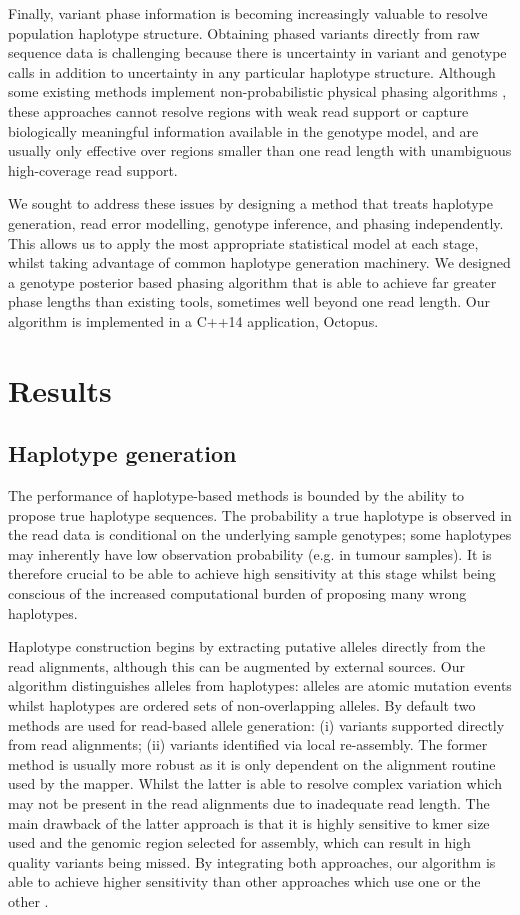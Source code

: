 \documentclass[notitlepage, twocolumn]{article}
\begin{document}
Finally, variant phase information is becoming increasingly valuable to resolve population haplotype structure. Obtaining phased variants directly from raw sequence data is challenging because there is uncertainty in variant and genotype calls in addition to uncertainty in any particular haplotype structure. Although some existing methods implement non-probabilistic physical phasing algorithms \cite{freebayes}, these approaches cannot resolve regions with weak read support or capture biologically meaningful information available in the genotype model, and are usually only effective over regions smaller than one read length with unambiguous high-coverage read support.

We sought to address these issues by designing a method that treats haplotype generation, read error modelling, genotype inference, and phasing independently. This allows us to apply the most appropriate statistical model at each stage, whilst taking advantage of common haplotype generation machinery. We designed a genotype posterior based phasing algorithm that is able to achieve far greater phase lengths than existing tools, sometimes well beyond one read length. Our algorithm is implemented in a C++14 application, Octopus.

\section*{Results}

\subsection*{Haplotype generation}

The performance of haplotype-based methods is bounded by the ability to propose true haplotype sequences. The probability a true haplotype is observed in the read data is conditional on the underlying sample genotypes; some haplotypes may inherently have low observation probability (e.g. in tumour samples). It is therefore crucial to be able to achieve high sensitivity at this stage whilst being conscious of the increased computational burden of proposing many wrong haplotypes.

Haplotype construction begins by extracting putative alleles directly from the read alignments, although this can be augmented by external sources. Our algorithm distinguishes alleles from haplotypes: alleles are atomic mutation events whilst haplotypes are ordered sets of non-overlapping alleles. By default two methods are used for read-based allele generation: (i) variants supported directly from read alignments; (ii) variants identified via local re-assembly. The former method is usually more robust as it is only dependent on the alignment routine used by the mapper. Whilst the latter is able to resolve complex variation which may not be present in the read alignments due to inadequate read length. The main drawback of the latter approach is that it is highly sensitive to kmer size used and the genomic region selected for assembly, which can result in high quality variants being missed. By integrating both approaches, our algorithm is able to achieve higher sensitivity than other approaches which use one or the other \cite{gatk, freebayes}.
\end{document}
